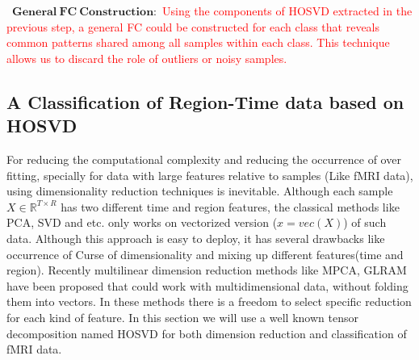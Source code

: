 \documentclass[preprint,12pt]{elsarticle}
\begin{document}
\textbullet\ $\mathbf{General~FC~Construction:}$
\textcolor{red}{
	Using the components of HOSVD extracted in the previous step, a general FC could be constructed for each class that reveals common patterns  shared among all samples within each class. This technique allows us to discard the role of outliers or noisy samples.  
}
\subsection{ A Classification of Region-Time data  based on  HOSVD}
For reducing the computational complexity and reducing the  occurrence of over fitting, specially for data with large features relative to samples (Like fMRI data), using  dimensionality reduction techniques is inevitable. Although each sample $X\in \mathbb{R}^{T\times R}$ has two different time and region features, the classical methods like PCA, SVD and etc. only  works on vectorized version ($x=vec(X)$) of such data.
Although this approach is easy to deploy, it has several drawbacks like occurrence of Curse of dimensionality and mixing up different features(time and region).
Recently multilinear dimension reduction methods like MPCA, GLRAM  have been proposed that
could work with multidimensional data, without folding them into vectors.
In these methods there is a freedom to select specific reduction for each kind of feature. In this section we will use a well known tensor decomposition named HOSVD for both dimension reduction and classification of fMRI data.
\end{document}
